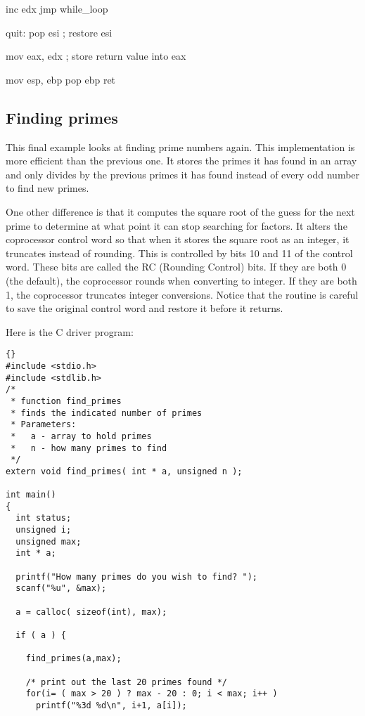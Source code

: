 {\begin{AsmCodeListing}[label=read.asm]
        inc     edx
        jmp     while_loop

quit:
        pop     esi                     ; restore esi

        mov     eax, edx                ; store return value into eax

        mov     esp, ebp
        pop     ebp
        ret 
\end{AsmCodeListing}

\subsection{Finding primes}

This final example looks at finding prime numbers again. This implementation
is more efficient than the previous one. It stores the primes it has found
in an array and only divides by the previous primes it has found instead of
every odd number to find new primes.

One other difference is that it computes the square root of the guess for the
next prime to determine at what point it can stop searching for factors. It
alters the coprocessor control word so that when it stores the 
square root as an integer, it truncates instead of rounding. This is 
controlled by bits 10 and 11 of the control word. These bits are called the
RC (Rounding Control) bits. If they are both 0 (the default), the coprocessor
rounds when converting to integer. If they are both 1, the coprocessor
truncates integer conversions. Notice that the routine is careful to save
the original control word and restore it before it returns.

Here is the C driver program:
\begin{lstlisting}{}
#include <stdio.h>
#include <stdlib.h>
/*
 * function find_primes
 * finds the indicated number of primes
 * Parameters:
 *   a - array to hold primes
 *   n - how many primes to find
 */
extern void find_primes( int * a, unsigned n );

int main()
{
  int status;
  unsigned i;
  unsigned max;
  int * a;

  printf("How many primes do you wish to find? ");
  scanf("%u", &max);

  a = calloc( sizeof(int), max);

  if ( a ) {

    find_primes(a,max);

    /* print out the last 20 primes found */
    for(i= ( max > 20 ) ? max - 20 : 0; i < max; i++ )
      printf("%3d %d\n", i+1, a[i]);


\end{lstlisting}}
